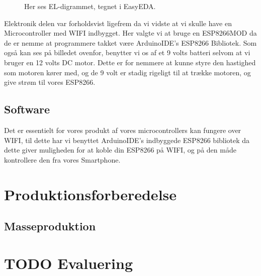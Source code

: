 \documentclass[11pt]{article}
\begin{document}
\begin{figure}[htbp]
    \centering
    \caption{Her ses EL-digrammet, tegnet i EasyEDA. }
    \end{figure}

Elektronik delen var forholdsvist ligefrem da vi vidste at vi skulle have en Microcontroller med WIFI indbygget. Her valgte vi at bruge en ESP8266MOD da de er nemme at programmere takket være ArduinoIDE's ESP8266 Bibliotek. Som også kan ses på billedet ovenfor, benytter vi os af et 9 volts batteri selvom at vi bruger en 12 volts DC motor. Dette er for nemmere at kunne styre den hastighed som motoren kører med, og de 9 volt er stadig rigeligt til at trække motoren, og give strøm til vores ESP8266.


\subsection{Software}
Det er essentielt for vores produkt af vores microcontrollers kan fungere over WIFI, til dette har vi benyttet ArduinoIDE's indbyggede ESP8266 bibliotek da dette giver muligheden for at koble din ESP8266 på WIFI, og på den måde kontrollere den fra vores Smartphone.

\section{Produktionsforberedelse}
\label{sec:orge880538}

\subsection{Masseproduktion}
\label{sec:orge66eada}
\section{{\bfseries\sffamily TODO} Evaluering}
\label{sec:org4ddb451}
\end{document}
